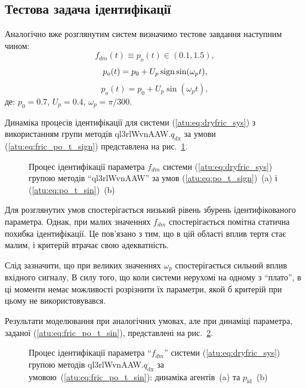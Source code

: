 

\subsection{Тестова задача ідентифікації} %

Аналогічно вже розглянутим систем визначимо тестове завдання
наступним чином:
\[
  f_{dm}(t) \equiv p_o(t) \in (0.1, 1.5),
\]
%
\begin{equation}
  p_o(t) = p_0 +  U_{p} \operatorname*{sign} \sin( \omega_{p} t ),
  \label{atu:eq:fric_po_t_sign}
\end{equation}
%
%
\begin{equation}
  p_o(t) = p_0 +  U_{p} \sin( \omega_{p} t ),
  \label{atu:eq:fric_po_t_sin}
\end{equation}
%
де:
$p_0 = 0.7$, $U_p=0.4$, $\omega_p = \pi / 300$.

Динаміка процесів ідентифікації для системи (\ref{atu:eq:dryfric_sys})
з використанням групи методів ql3rlWvnAAW.$q_\mathrm{dx} $ за умови (\ref{atu:eq:fric_po_t_sign})
представлена на рис.~\ref{atu:f:fric_id_ql3rlWvnAAW_q_dx_sign}.

\begin{figure}[htb!]
\caption{
  Процес ідентифікації параметра $f_{dm}$ системи (\ref{atu:eq:dryfric_sys}) групою методів ``ql3rlWvnAAW''
  за умов (\ref{atu:eq:po_t_sign})~(a) і  (\ref{atu:eq:po_t_sin})~(b)
}
\label{atu:f:fric_id_ql3rlWvnAAW_q_dx_sign}
\end{figure}

Для розглянутих умов спостерігається низький рівень збурень
ідентифікованого параметра. Однак, при малих значеннях
$ f_{dm} $ спостерігається помітна статична похибка
ідентифікації. Це пов'язано з тим, що в цій області вплив тертя
стає малим, і критерій втрачає свою адекватність.

Слід зазначити, що при великих значеннях
$ \omega_p $ спостерігається сильний вплив вхідного сигналу, В силу
того, що коли системи нерухомі на одному з ``плато'', в ці моменти
немає можливості розрізнити їх параметри, якой б критерій при
цьому не використовувався.

Результати моделювання при аналогічних умовах, але при
динаміці параметра, заданої (\ref{atu:eq:fric_po_t_sin}), представлені на
рис.~\ref{atu:f:fric_id_ql3rlWvnAAW_q_dx_sin}.

\begin{figure}[htb!]
  \caption{Процес ідентифікації параметра ``$f_{dm}$'' системи (\ref{atu:eq:dryfric_sys}) групою методів ql3rlWvnAAW.$q_\mathrm{dx}$ за умовою~(\ref{atu:eq:fric_po_t_sin}): динаміка агентів~(a) та $p_\mathrm{id}$~(b)}
\label{atu:f:fric_id_ql3rlWvnAAW_q_dx_sin}
\end{figure}

